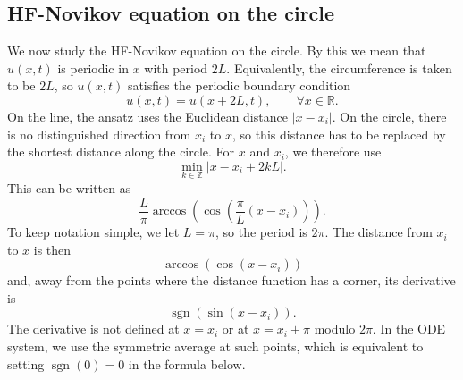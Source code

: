 \documentclass[english,master]{liumaiex}
\theoremstyle{thesisplain}
\theoremstyle{thesisdefinition}
\DeclareMathOperator{\sgn}{sgn}
\numberwithin{equation}{section}
\begin{document}
\subsection{HF-Novikov equation on the circle}

We now study the HF-Novikov equation on the circle. By this we mean that $u(x, t)$ is periodic in $x$ with period $2L$. Equivalently, the circumference is taken to be $2L$, so $u(x, t)$ satisfies the periodic boundary condition
\begin{equation}
	u(x,t) = u(x + 2L, t), \qquad \forall x \in \mathbb{R}.
\end{equation}
On the line, the ansatz uses the Euclidean distance $|x-x_i|$. On the circle, there is no distinguished direction from $x_i$ to $x$, so this distance has to be replaced by the shortest distance along the circle. For $x$ and $x_i$, we therefore use
\begin{equation}
	\min_{k \in \mathbb{Z}} |x - x_i + 2kL|.
\end{equation}
This can be written as
\begin{equation}
	\frac{L}{\pi}\arccos(\cos(\frac{\pi}{L}(x - x_i))).
\end{equation}
To keep notation simple, we let $L = \pi$, so the period is $2\pi$. The distance from $x_i$ to $x$ is then
\begin{equation}
	\arccos(\cos(x - x_i))
\end{equation}
and, away from the points where the distance function has a corner, its derivative is
\begin{equation}
	\sgn(\sin(x - x_i)).
\end{equation}
The derivative is not defined at $x=x_i$ or at $x=x_i+\pi$ modulo $2\pi$. In the ODE system, we use the symmetric average at such points, which is equivalent to setting $\sgn(0)=0$ in the formula below.
\end{document}

